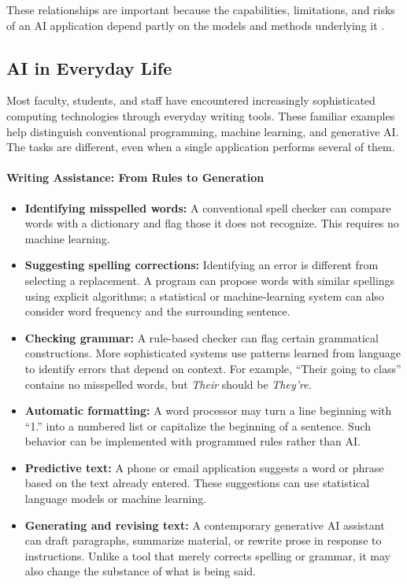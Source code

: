 \documentclass[11pt]{article}
\begin{document}
These relationships are important because the capabilities,
limitations, and risks of an AI application depend partly on
the models and methods underlying it \citep{Bommasani2021}.

\FloatBarrier
\subsection{AI in Everyday Life}

Most faculty, students, and staff have encountered increasingly sophisticated computing
technologies through everyday writing tools. These familiar examples
help distinguish conventional programming, machine learning, and
generative AI. The tasks are different, even when a single application
performs several of them.

\paragraph{Writing Assistance: From Rules to Generation}

\begingroup
\setlength{\leftmargini}{1em}
\begin{itemize}

\item \textbf{Identifying misspelled words:}
A conventional spell checker can compare words with a dictionary and
flag those it does not recognize. This requires no machine learning.

\item \textbf{Suggesting spelling corrections:}
Identifying an error is different from selecting a replacement. A
program can propose words with similar spellings using explicit
algorithms; a statistical or machine-learning system can also consider
word frequency and the surrounding sentence.

\item \textbf{Checking grammar:}
A rule-based checker can flag certain grammatical constructions.
More sophisticated systems use patterns learned from language to
identify errors that depend on context. For example, ``Their going
to class'' contains no misspelled words, but \emph{Their} should be
\emph{They're}.

\item \textbf{Automatic formatting:}
A word processor may turn a line beginning with ``1.'' into a numbered
list or capitalize the beginning of a sentence. Such behavior can be
implemented with programmed rules rather than AI.

\item \textbf{Predictive text:}
A phone or email application suggests a word or phrase based on the
text already entered. These suggestions can use statistical language
models or machine learning.

\item \textbf{Generating and revising text:}
A contemporary generative AI assistant can draft paragraphs, summarize
material, or rewrite prose in response to instructions. Unlike a tool
that merely corrects spelling or grammar, it may also change the
substance of what is being said.
\end{itemize}
\endgroup
\end{document}
